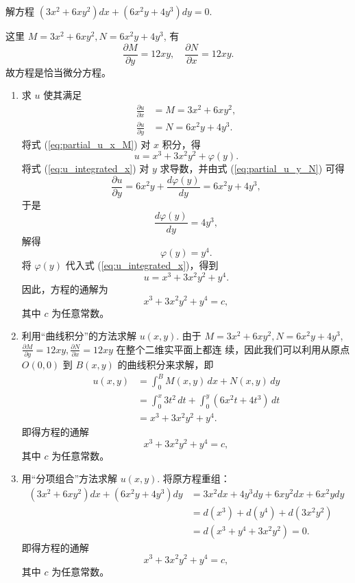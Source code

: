 \begin{example}
    解方程 $(3x^2+6xy^2)dx+(6x^2y+4y^3)dy=0$.
\end{example}
\begin{solution}
    这里 $M=3x^2+6xy^2, N=6x^2y+4y^3$, 有
$$\frac{\partial M}{\partial y} = 12xy, \quad \frac{\partial N}{\partial x} = 12xy.$$
故方程是恰当微分方程。
\begin{enumerate}
    \item 求 $u$ 使其满足
\begin{align}
\frac{\partial u}{\partial x} &= M=3x^2+6xy^2, \label{eq:partial_u_x_M} \\
\frac{\partial u}{\partial y} &= N=6x^2y+4y^3. \label{eq:partial_u_y_N}
\end{align}
将式 (\ref{eq:partial_u_x_M}) 对 $x$ 积分，得
\begin{equation}
u=x^3+3x^2y^2+\varphi(y). \label{eq:u_integrated_x}
\end{equation}
将式 (\ref{eq:u_integrated_x}) 对 $y$ 求导数，并由式 (\ref{eq:partial_u_y_N}) 可得
$$\frac{\partial u}{\partial y} = 6x^2y+\frac{d\varphi(y)}{dy} = 6x^2y+4y^3,$$
于是
$$\frac{d\varphi(y)}{dy} = 4y^3,$$
解得
$$\varphi(y)=y^4.$$
将 $\varphi(y)$ 代入式 (\ref{eq:u_integrated_x})，得到
$$u=x^3+3x^2y^2+y^4.$$
因此，方程的通解为
$$x^3+3x^2y^2+y^4=c,$$
其中 $c$ 为任意常数。
    \item 利用“曲线积分”的方法求解 $u(x,y)$.
由于 $M=3x^2+6xy^2, N=6x^2y+4y^3$, $\frac{\partial M}{\partial y} = 12xy, \frac{\partial N}{\partial x} = 12xy$ 在整个二维实平面上都连
续，因此我们可以利用从原点 $O(0,0)$ 到 $B(x,y)$ 的曲线积分来求解，即
\begin{align*}
u(x,y) &= \int_0^B M(x,y)\,dx +  N(x,y)\,dy \\
&= \int_0^x 3t^2\,dt + \int_0^y (6x^2t+4t^3)\,dt \\
&= x^3+3x^2y^2+y^4.
\end{align*}
即得方程的通解
$$x^3+3x^2y^2+y^4=c,$$
其中 $c$ 为任意常数。
    \item 用“分项组合”方法求解 $u(x,y)$.
将原方程重组：
\begin{align*}
(3x^2+6xy^2)dx+(6x^2y+4y^3)dy &= 3x^2dx+4y^3dy+6xy^2dx+6x^2ydy \\
&= d(x^3)+d(y^4)+d(3x^2y^2) \\
&= d(x^3+y^4+3x^2y^2) = 0.
\end{align*}
即得方程的通解
$$x^3+3x^2y^2+y^4=c,$$
其中 $c$ 为任意常数。
\end{enumerate}

\end{solution}

